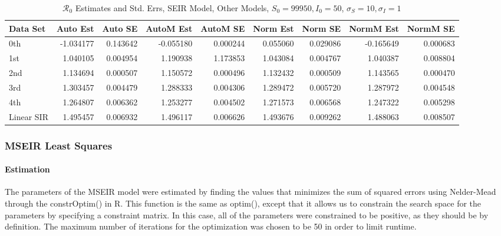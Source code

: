 \documentclass[12pt]{article}
\newcommand{\rr}{\ensuremath{\mathcal{R}_0}}
\begin{document}
\begin{table}[H]
	
	\caption{$\rr$ Estimates and Std. Errs, SEIR Model,
		Other Models, $S_0 = 99950, I_0 = 50$, 
		$\sigma_S = 10, \sigma_I = 1$}
	\begin{footnotesize}
		\hskip -1cm
	\begin{tabular}{l|r|r|r|r|r|r|r|r}
		\hline
		Data Set & Auto Est & Auto SE & AutoM Est & AutoM SE & Norm Est & Norm SE & NormM Est & NormM SE\\
		\hline
		0th & -1.034177 & 0.143642 & -0.055180 & 0.000244 & 0.055060 & 0.029086 & -0.165649 & 0.000683\\
		\hline
		1st & 1.040105 & 0.004954 & 1.190938 & 1.173853 & 1.043084 & 0.004767 & 1.040387 & 0.008804\\
		\hline
		2nd & 1.134694 & 0.000507 & 1.150572 & 0.000496 & 1.132432 & 0.000509 & 1.143565 & 0.000470\\
		\hline
		3rd & 1.303457 & 0.004479 & 1.288333 & 0.004306 & 1.289472 & 0.005720 & 1.287972 & 0.004548\\
		\hline
		4th & 1.264807 & 0.006362 & 1.253277 & 0.004502 & 1.271573 & 0.006568 & 1.247322 & 0.005298\\
		\hline
		Linear SIR & 1.495457 & 0.006932 & 1.496117 & 0.006626 & 1.493676 & 0.009262 & 1.488063 & 0.008507\\
		\hline
	\end{tabular}
\end{footnotesize}
\end{table}

\subsubsection{MSEIR Least Squares}

\paragraph{Estimation}

The parameters of the MSEIR model were estimated by finding the values that minimizes the sum of squared errors using Nelder-Mead through the constrOptim() in R. This function is the same as optim(), except that it allows us to constrain the search space for the parameters by specifying a constraint matrix. In this case, all of the parameters were constrained to be positive, as they should be by definition. The maximum number of iterations for the optimization was chosen to be 50 in order to limit runtime. 
\end{document}
